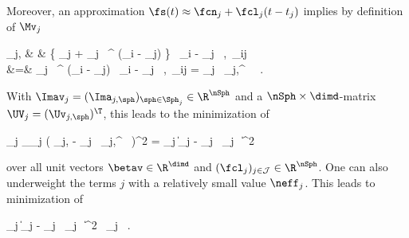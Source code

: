 Moreover, an approximation \( \fs(t) \approx \fcn_{j} + \fcl_{j} (t - t_{j}) \) implies by definition of \( \Xbar_{j} \)
\begin{EQA}[rcl]
	\E \Ima_{j,\sph}
	& \approx &
	\sumI \bigl\{ \fcn_{j} + \fcl_{j} \, \betav^{\T} (\Xv_{i} - \xv_{j}) \bigr\} \, \langle \Xv_{i} - \Xbar_{j} \, ,\sph \rangle \, \weight_{ij}
	\\
	&=&
	\sumI \fcl_{j} \, \betav^{\T} (\Xv_{i} - \Xbar_{j}) \, \langle \Xv_{i} - \Xbar_{j} \, ,\sph \rangle \, \weight_{ij}
	=
	\fcl_{j} \, \Uv_{j,\sph}^{\T} \, \betav
	\, .
\end{EQA}
With \( \Imav_{j} = (\Ima_{j,\sph})_{\sph \in \Sph_{j}} \in \R^{\nSph} \) and a \( \nSph \times \dimd \)-matrix 
\( \UV_{j} = (\Uv_{j,\sph})^{\T} \), this leads to the minimization of
\begin{EQA}[c]
	\sum_{j \in \JJJ} \sum_{\sph \in \Sph_{j}} \bigl( \Ima_{j,\sph} - \fcl_{j} \, \Uv_{j,\sph}^{\T} \, \betav \bigr)^{2} 
	=
	\sum_{j \in \JJJ} \bigl\| \Imav_{j} - \fcl_{j} \, \UV_{j} \, \betav \bigr\|^{2}
	\qquad
\label{ikdfjoiefjoieuAVE}
\end{EQA}
over all unit vectors \( \betav \in \R^{\dimd} \) and \( (\fcl_{j})_{j \in \JJJ} \in \R^{\nSph} \). 
One can also underweight the terms \( j \) with a relatively small value \( \neff_{j} \).
This leads to minimization of 
\begin{EQA}[c]
	\sum_{j \in \JJJ} \bigl\| \Imav_{j} - \fcl_{j} \, \UV_{j} \, \betav \bigr\|^{2} \,
	\neff_{j}
	\, .
\end{EQA}

